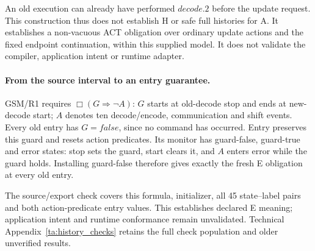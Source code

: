 An old execution can already have performed $decode.2$ before the update request. This construction thus does not establish H or safe full histories for A. It establishes a non-vacuous ACT obligation over ordinary update actions and the fixed endpoint continuation, within this supplied model. It does not validate the compiler, application intent or runtime adapter.

\paragraph{From the source interval to an entry guarantee.}
GSM/R1 requires $\Box(G\Rightarrow\neg A)$: $G$ starts at old-decode stop and ends at new-decode start; $A$ denotes ten decode/encode, communication and shift events. Every old entry has $G=false$, since no command has occurred. Entry preserves this guard and resets action predicates. Its monitor has guard-false, guard-true and error states: stop sets the guard, start clears it, and $A$ enters error while the guard holds. Installing guard-false therefore gives exactly the fresh E obligation at every old entry.

The source/export check covers this formula, initializer, all 45 state--label pairs and both action-predicate entry values. This establishes declared E meaning; application intent and runtime conformance remain unvalidated. Technical Appendix~\ref{ta:history_checks} retains the full check population and older unverified results.
